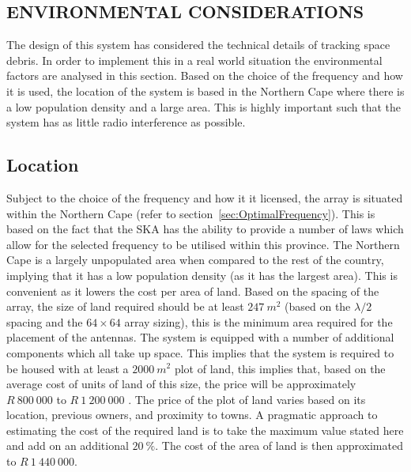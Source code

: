 \documentclass[11pt]{witseiepaper}
\begin{document}
\begin{bibunit}[witseie]
\section{ENVIRONMENTAL CONSIDERATIONS} \label{sec:EnvironmentalConsiderations}
The design of this system has considered the technical details of tracking space debris. In order to implement this in a real world situation the environmental factors are analysed in this section.
Based on the choice of the frequency and how it is used, the location of the system is based in the Northern Cape where there is a low population density and a large area. This is highly important such that the system has as little radio interference as possible.

\subsection{Location} \label{sec:Location}
Subject to the choice of the frequency and how it it licensed, the array is situated within the Northern Cape (refer to section~\ref{sec:OptimalFrequency}). This is based on the fact that the SKA has the ability to provide a number of laws which allow for the selected frequency to be utilised within this province.
The Northern Cape is a largely unpopulated area when compared to the rest of the country, implying that it has a low population density (as it has the largest area). This is convenient as it lowers the cost per area of land. 
Based on the spacing of the array, the size of land required should be at least $247~m^2$ (based on the $\lambda/2$ spacing and the $64 \times 64$ array sizing), this is the minimum area required for the placement of the antennas. The system is equipped with a number of additional components which all take up space.
This implies that the system is required to be housed with at least a $2000~m^2$ plot of land, this implies that, based on the average cost of units of land of this size, the price will be approximately $R~800~000$ to $R~1~200~000$ \cite{LocationPrice1, LocationPrice2, LocationPrice3}.
The price of the plot of land varies based on its location, previous owners, and proximity to towns. A pragmatic approach to estimating the cost of the required land is to take the maximum value stated here and add on an additional $20~\%$. The cost of the area of land is then approximated to $R~1~440~000$.


\end{bibunit}
\end{document}
